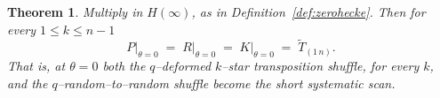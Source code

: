 \documentclass[11pt]{article}
\theoremstyle{plain}  %
\newtheorem{theorem}{Theorem}[section]
\begin{document}


\begin{theorem}\label{prop:theta0}
Multiply in $H(\infty)$, as in Definition~\ref{def:zerohecke}. Then for every
$1 \le k \le n-1$
$$
  P\big|_{\theta=0} \;=\; R\big|_{\theta=0} \;=\; K\big|_{\theta=0}
  \;=\; \widetilde T_{(1\,n)} .
$$
That is, at $\theta = 0$ both the $q$--deformed $k$--star transposition shuffle, for every $k$, and
the $q$--random--to--random shuffle become the short systematic scan.
\end{theorem}
\end{document}
